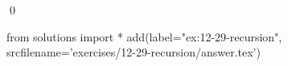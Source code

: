 
\begin{ex}
  \label{ex:12-29-recursion}
  
  \qed
\end{ex}
\begin{python0}
from solutions import *
add(label="ex:12-29-recursion",
    srcfilename='exercises/12-29-recursion/answer.tex')
\end{python0}

